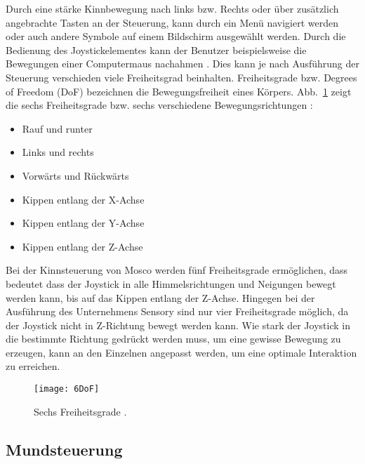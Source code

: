Durch eine stärke Kinnbewegung nach links bzw. Rechts oder über zusätzlich angebrachte Tasten an der Steuerung, kann durch ein Menü navigiert werden oder auch andere Symbole auf einem Bildschirm ausgewählt werden. Durch die Bedienung des Joystickelementes kann der Benutzer beispielsweise die Bewegungen einer Computermaus nachahmen \cite{MOSO} \cite{SENSORY}. 
\newline
Dies kann je nach Ausführung der Steuerung verschieden viele Freiheitsgrad beinhalten. Freiheitsgrade bzw. Degrees of Freedom (DoF) bezeichnen die Bewegungsfreiheit eines Körpers. Abb.~\ref{fig:6DoF} zeigt die sechs Freiheitsgrade bzw. sechs verschiedene Bewegungsrichtungen \cite{6DoF}:
\begin{itemize}
      \item Rauf und runter 
      \item Links und rechts 
			\item Vorwärts und Rückwärts 
			\item Kippen entlang der X-Achse 
      \item Kippen entlang der Y-Achse
			\item Kippen entlang der Z-Achse
\end{itemize}
%
\vspace{\baselineskip}
Bei der Kinnsteuerung von Mosco werden fünf Freiheitsgrade ermöglichen, dass bedeutet dass der Joystick in alle Himmelsrichtungen und Neigungen bewegt werden kann, bis auf das Kippen entlang der Z-Achse. Hingegen bei der Ausführung des Unternehmens Sensory sind nur vier Freiheitsgrade möglich, da der Joystick nicht in Z-Richtung bewegt werden kann. 
Wie stark der Joystick in die bestimmte Richtung gedrückt werden muss, um eine gewisse Bewegung zu erzeugen, kann an den Einzelnen angepasst werden, um eine optimale Interaktion zu erreichen.
%
\begin{figure}
\centering
\texttt{[image: 6DoF]}
\caption{Sechs Freiheitsgrade \cite{6DoFPic}.}
\label{fig:6DoF}
\end{figure}
%
%

\subsection{Mundsteuerung}

